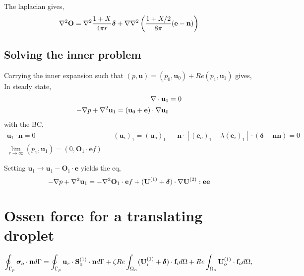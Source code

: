 The laplacian gives, 
\begin{align*}
    \grad^2\textbf{O}
    &= 
    \grad^2 \frac{1+X}{4\pi r}\bm\delta
    +\grad\grad^2 \left(\frac{1+X/2}{8\pi} (\textbf{e}-\textbf{n})\right)\\
\end{align*}

\subsection{Solving the inner problem}

Carrying the inner expansion such that $(p,\textbf{u}) = (p_0,\textbf{u}_0)+ Re (p_1,\textbf{u}_1)$ gives,
In steady state,
\begin{align}
    \div \textbf{u}_1 &= 0
    \\
    -\grad p + \grad^2 \textbf{u}_1
    = 
    (\textbf{u}_0+ \textbf{e})\cdot \grad \textbf{u}_0
\end{align}
with the BC, 
\begin{align}
    \textbf{u}_1 \cdot \textbf{n} = 0 
    &&
    (\textbf{u}_i)_1  =(\textbf{u}_o)_1
    &&
    \textbf{n}\cdot [(\textbf{e}_o)_1 - \lambda(\textbf{e}_i)_1]\cdot (\bm\delta - \textbf{nn})
    =0 \\
    \lim_{r\to \infty }(p_1,\textbf{u}_1)= (0,\textbf{O}_1 \cdot \textbf{e}f)
\end{align}

Setting $\textbf{u}_1 \to \textbf{u}_1 - \textbf{O}_1\cdot \textbf{e}$ yields the eq, 
\begin{equation}
    -\grad p 
    + \grad^2 \textbf{u}_1
    = 
    - \grad^2 \textbf{O}_1 \cdot \textbf{e}f
    + (\textbf{U}^{(1)} + \bm\delta) \cdot \grad \textbf{U}^{(2)} : \textbf{ee}
\end{equation}



\section{Ossen force for a translating droplet}
\begin{equation}
    \intS[p]{\bm\sigma_{o}\cdot \textbf{n}}
    =
    \intS[p]{\textbf{u}_{r}\cdot \textbf{S}_{o}^{(1)}\cdot \textbf{n}}
    + \zeta Re \intO{(\textbf{U}_{i}^{(1)} + \bm\delta)\cdot \textbf{f}_{i}}
    + Re\intO[o]{\textbf{U}_{o}^{(1)}\cdot \textbf{f}_{o}},
\end{equation}

